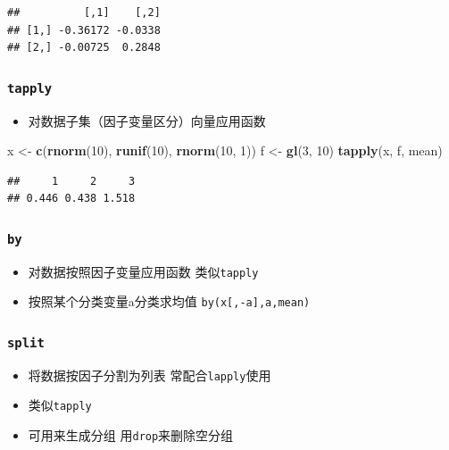 \documentclass[]{book}
\newenvironment{Shaded}{\begin{snugshade}}{\end{snugshade}}
\newcommand{\DecValTok}[1]{\textcolor[rgb]{0.00,0.00,0.81}{#1}}
\newcommand{\KeywordTok}[1]{\textcolor[rgb]{0.13,0.29,0.53}{\textbf{#1}}}
\newcommand{\NormalTok}[1]{#1}
\newcommand{\StringTok}[1]{\textcolor[rgb]{0.31,0.60,0.02}{#1}}
\providecommand{\tightlist}{%
  \setlength{\itemsep}{0pt}\setlength{\parskip}{0pt}}
\begin{document}
\begin{verbatim}
##          [,1]    [,2]
## [1,] -0.36172 -0.0338
## [2,] -0.00725  0.2848
\end{verbatim}

\hypertarget{tapply}{%
\subsubsection{\texorpdfstring{\texttt{tapply}}{tapply}}\label{tapply}}

\begin{itemize}
\tightlist
\item
  对数据子集（因子变量区分）向量应用函数
\end{itemize}

\begin{Shaded}
\begin{Highlighting}[]
\NormalTok{x <-}\StringTok{ }\KeywordTok{c}\NormalTok{(}\KeywordTok{rnorm}\NormalTok{(}\DecValTok{10}\NormalTok{), }\KeywordTok{runif}\NormalTok{(}\DecValTok{10}\NormalTok{), }\KeywordTok{rnorm}\NormalTok{(}\DecValTok{10}\NormalTok{, }\DecValTok{1}\NormalTok{))}
\NormalTok{f <-}\StringTok{ }\KeywordTok{gl}\NormalTok{(}\DecValTok{3}\NormalTok{, }\DecValTok{10}\NormalTok{)}
\KeywordTok{tapply}\NormalTok{(x, f, mean)}
\end{Highlighting}
\end{Shaded}

\begin{verbatim}
##     1     2     3 
## 0.446 0.438 1.518
\end{verbatim}

\hypertarget{by}{%
\subsubsection{\texorpdfstring{\texttt{by}}{by}}\label{by}}

\begin{itemize}
\tightlist
\item
  对数据按照因子变量应用函数 类似\texttt{tapply}
\item
  按照某个分类变量a分类求均值 \texttt{by(x{[},-a{]},a,mean)}
\end{itemize}

\hypertarget{split}{%
\subsubsection{\texorpdfstring{\texttt{split}}{split}}\label{split}}

\begin{itemize}
\tightlist
\item
  将数据按因子分割为列表 常配合\texttt{lapply}使用
\item
  类似\texttt{tapply}
\item
  可用来生成分组 用\texttt{drop}来删除空分组
\end{itemize}
\end{document}
